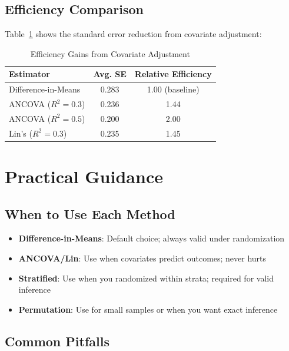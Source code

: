\subsection{Efficiency Comparison}

Table~\ref{tab:rct_efficiency} shows the standard error reduction from covariate adjustment:

\begin{table}[ht]
\centering
\caption{Efficiency Gains from Covariate Adjustment}
\label{tab:rct_efficiency}
\begin{tabular}{lcc}
\toprule
\textbf{Estimator} & \textbf{Avg. SE} & \textbf{Relative Efficiency} \\
\midrule
Difference-in-Means & 0.283 & 1.00 (baseline) \\
ANCOVA ($R^2=0.3$) & 0.236 & 1.44 \\
ANCOVA ($R^2=0.5$) & 0.200 & 2.00 \\
Lin's ($R^2=0.3$) & 0.235 & 1.45 \\
\bottomrule
\end{tabular}
\end{table}


\section{Practical Guidance}
\label{sec:rct_guidance}

\subsection{When to Use Each Method}

\begin{itemize}
    \item \textbf{Difference-in-Means}: Default choice; always valid under randomization
    \item \textbf{ANCOVA/Lin}: Use when covariates predict outcomes; never hurts
    \item \textbf{Stratified}: Use when you randomized within strata; required for valid inference
    \item \textbf{Permutation}: Use for small samples or when you want exact inference
\end{itemize}

\subsection{Common Pitfalls}

